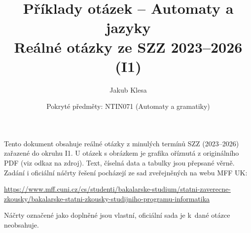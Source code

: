 \documentclass[11pt,a4paper]{article}
\title{Příklady otázek -- Automaty a jazyky\\[0.3em]\large Reálné otázky ze SZZ 2023--2026 (I1)}
\author{Jakub Klesa}
\date{Pokryté předměty: NTIN071 (Automaty a gramatiky)}
\begin{document}
\maketitle
\tableofcontents
\bigskip

\begin{poznamka}
Tento dokument obsahuje reálné otázky z minulých termínů SZZ (2023--2026) zařazené do
okruhu I1. U otázek s obrázkem je grafika oříznutá z originálního PDF (viz odkaz na
zdroj). Text, číselná data a tabulky jsou přepsané věrně.
Zadání i oficiální náčrty řešení pocházejí ze sad zveřejněných na webu MFF UK:\par
{\raggedright\url{https://www.mff.cuni.cz/cs/studenti/bakalarske-studium/statni-zaverecne-zkousky/bakalarske-statni-zkousky-studijniho-programu-informatika}\par}
Náčrty označené jako doplněné jsou vlastní, oficiální sada je k~dané otázce neobsahuje.
\end{poznamka}
\bigskip








\end{document}

